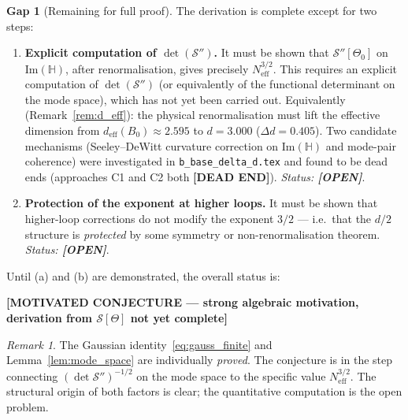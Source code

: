 \documentclass[11pt,a4paper]{article}
\theoremstyle{definition}
\newtheorem{gap}{Gap}
\theoremstyle{remark}
\newtheorem{remark}{Remark}
\begin{document}
\begin{gap}[Remaining for full proof]
\label{gap:remaining}
  The derivation is complete except for two steps:
  \begin{enumerate}
    \item[(a)] \textbf{Explicit computation of $\det(\mathcal{S}'')$.}
      It must be shown that $\mathcal{S}''[\Theta_0]$ on $\mathrm{Im}(\mathbb{H})$,
      after renormalisation, gives precisely $N_{\mathrm{eff}}^{3/2}$.
      This requires an explicit computation of $\det(\mathcal{S}'')$
      (or equivalently of the functional determinant on the mode space),
      which has not yet been carried out.
      Equivalently (Remark~\ref{rem:d_eff}): the physical renormalisation
      must lift the effective dimension from
      $d_{\mathrm{eff}}(B_0) \approx 2.595$ to $d = 3.000$ ($\Delta d = 0.405$).
      Two candidate mechanisms (Seeley--DeWitt curvature correction on
      $\mathrm{Im}(\mathbb{H})$ and mode-pair coherence) were investigated in
      \texttt{b\_base\_delta\_d.tex} and found to be dead ends
      (approaches C1 and C2 both \textbf{[DEAD END]}).
      \textit{Status: \textbf{[OPEN]}}.

    \item[(b)] \textbf{Protection of the exponent at higher loops.}
      It must be shown that higher-loop corrections do not modify the exponent
      $3/2$ — i.e.\ that the $d/2$ structure is \emph{protected} by some
      symmetry or non-renormalisation theorem.
      \textit{Status: \textbf{[OPEN]}}.
  \end{enumerate}

  Until (a) and (b) are demonstrated, the overall status is:\\
  \centerline{\textbf{[MOTIVATED CONJECTURE — strong algebraic motivation,
  derivation from $\mathcal{S}[\Theta]$ not yet complete]}}
\end{gap}

\begin{remark}
  The Gaussian identity~\eqref{eq:gauss_finite} and
  Lemma~\ref{lem:mode_space} are individually \emph{proved}.
  The conjecture is in the step connecting $(\det \mathcal{S}'')^{-1/2}$
  on the mode space to the specific value $N_{\mathrm{eff}}^{3/2}$.
  The structural origin of both factors is clear; the quantitative computation
  is the open problem.
\end{remark}
\end{document}
